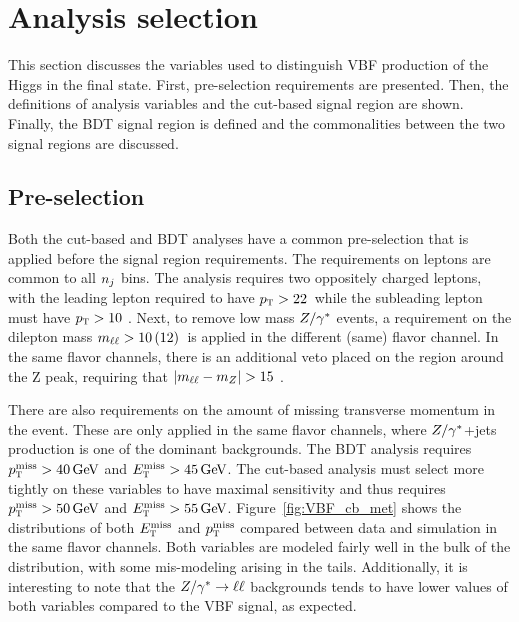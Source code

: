 \section{Analysis selection}

This section discusses the variables used to distinguish VBF production of the Higgs in the \HWWfull final state. First, pre-selection requirements are presented. Then, the definitions of analysis variables and the cut-based signal region are shown. Finally, the BDT signal region is defined and the commonalities between the two signal regions are discussed.  


\subsection{Pre-selection}
\label{sec:vbf_presel}
Both the cut-based and BDT analyses have a common pre-selection that is applied before the signal region requirements. The requirements on leptons are common to all $n_j$ bins. The analysis requires two oppositely charged leptons, with the leading lepton required to have $p_{\textrm{\footnotesize\sc t}} > 22$ \GeV\,while the subleading lepton must have $p_{\textrm{\footnotesize\sc t}} > 10$ \GeV. Next, to remove low mass $Z/\gamma^{\ast}$ events, a requirement on the dilepton mass $m_{\ell\ell} > 10\, (12)$ \GeV\,is applied in the different (same) flavor channel. In the same flavor channels, there is an additional veto placed on the region around the Z peak, requiring that $|m_{\ell\ell} - m_Z| > 15$ \GeV. 

There are also requirements on the amount of missing transverse momentum in the event. These are only applied in the same flavor channels, where $Z/\gamma^{\ast}$+jets production is one of the dominant backgrounds. The BDT analysis requires $\MPTj > 40 \GeV$ and $\MET > 45 \GeV$. The cut-based analysis must select more tightly on these variables to have maximal sensitivity and thus requires $\MPTj > 50 \GeV$ and $\MET > 55 \GeV$. Figure~\ref{fig:VBF_cb_met} shows the distributions of both $E_{\textrm{\footnotesize\sc t}}^{\rm miss}$ and $p_{\textrm{\footnotesize\sc t}}^{\rm miss}$ compared between data and simulation in the same flavor channels. Both variables are modeled fairly well in the bulk of the distribution, with some mis-modeling arising in the tails. Additionally, it is interesting to note that the $Z/\gamma^{\ast}\to \ell\ell$ backgrounds tends to have lower values of both variables compared to the VBF signal, as expected.

